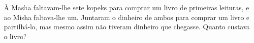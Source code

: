 À Masha faltavam-lhe sete kopeks para comprar um livro de primeiras leituras, e ao Misha faltava-lhe um.
Juntaram o dinheiro de ambos para comprar um livro e partilhá-lo, mas mesmo assim não tiveram dinheiro que chegasse.
Quanto custava o livro?
